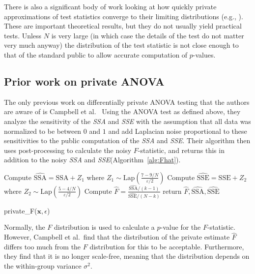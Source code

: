 \documentclass[USenglish,oneside]{article}
\newcounter{ab}
\newcounter{ar}
\newcounter{igh}
\newcommand{\dbsize}{\ensuremath{N}\xspace}
\newcommand{\eps}{\ensuremath{\varepsilon}\xspace}
\renewcommand{\k}{\ensuremath{k}\xspace}
\newcommand{\sse}{\textit{SSE}\xspace}
\newcommand{\ssa}{\textit{SSA}\xspace}
\newcommand{\x}{\ensuremath{\mathbf{x}}\xspace}
\begin{document}
There is also a significant body of work looking at how quickly private approximations of test statistics converge to their limiting distributions (e.g., \cite{smith2008efficient, wasserman2010statistical, smith2011privacy}).  These are important theoretical results, but they do not usually yield practical tests.  Unless $N$ is very large (in which case the details of the test do not matter very much anyway) the distribution of the test statistic is not close enough to that of the standard public to allow accurate computation of $p$-values.


\subsection{Prior work on private ANOVA}

The only previous work on differentially private ANOVA testing that the authors are aware of is Campbell et al.~\cite{campbell2018diffprivanova} Using the ANOVA test as defined above, they analyze the sensitivity of the \ssa and \sse with the assumption that all data was normalized to be between $0$ and $1$ and add Laplacian noise proportional to these sensitivities to the public computation of the \ssa and \sse. Their algorithm then uses post-processing to calculate the noisy $F$-statistic, and returns this in addition to the noisy \ssa and \sse (Algorithm~\ref{alg:Fhat}). 
\begin{algorithm}
    \begin{algorithmic}
        \STATE Compute $\widehat{\text{SSA}} = \text{SSA} + Z_1$ where $Z_1\sim\text{Lap}\left(\frac{7 - 9/N}{\eps/2}\right)$
        \STATE Compute $\widehat{\text{SSE}} = \text{SSE} + Z_2$ where $Z_2\sim\text{Lap}\left(\frac{5-4/N}{\eps/2}\right)$
        \STATE Compute $\widehat{F} = \frac{\widehat{\text{SSA}}/(\k-1)}{\widehat{\text{SSE}}/(\dbsize-\k)}$
        \STATE return $\widehat{F}, \widehat{\text{SSA}}, \widehat{\text{SSE}}$
    \end{algorithmic}
    \caption{private\_F($\x, \epsilon$)} 
     \label{alg:Fhat}
\end{algorithm}

Normally, the $F$ distribution is used to calculate a $p$-value for the $F$-statistic. However, Campbell et al.~find that the distribution of the private estimate $\widehat{F}$ differs too much from the $F$ distribution for this to be acceptable.  Furthermore, they find that it is no longer scale-free, meaning that the distribution depends on the within-group variance $\sigma^2$.  
\end{document}
